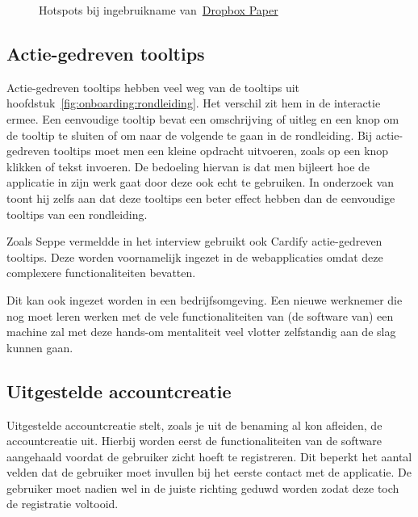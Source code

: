 \begin{figure}[h!]
    \centering
    \qquad
    \caption[Voorbeeld hotspots]{Hotspots bij ingebruikname van~\href{https://www.dropbox.com/paper}{Dropbox Paper}}
    \label{fig:onboarding:hotspots}
\end{figure}

\subsection{Actie-gedreven tooltips}
\label{sec:onboarding:actie-tooltips}

Actie-gedreven tooltips hebben veel weg van de tooltips uit hoofdstuk~\ref{fig:onboarding:rondleiding}. Het verschil zit hem in de interactie ermee. Een eenvoudige tooltip bevat een omschrijving of uitleg en een knop om de tooltip te sluiten of om naar de volgende te gaan in de rondleiding. Bij actie-gedreven tooltips moet men een kleine opdracht uitvoeren, zoals op een knop klikken of tekst invoeren. De bedoeling hiervan is dat men bijleert hoe de applicatie in zijn werk gaat door deze ook echt te gebruiken. In onderzoek van~\textcite{Oliveira2019} toont hij zelfs aan dat deze tooltips een beter effect hebben dan de eenvoudige tooltips van een rondleiding.

Zoals Seppe vermeldde in het interview gebruikt ook Cardify actie-gedreven tooltips. Deze worden voornamelijk ingezet in de webapplicaties omdat deze complexere functionaliteiten bevatten.

Dit kan ook ingezet worden in een bedrijfsomgeving. Een nieuwe werknemer die nog moet leren werken met de vele functionaliteiten van (de software van) een machine zal met deze hands-om mentaliteit veel vlotter zelfstandig aan de slag kunnen gaan.

\subsection{Uitgestelde accountcreatie}
\label{sec:onboarding:uitgestelde-accountcreatie}

Uitgestelde accountcreatie stelt, zoals je uit de benaming al kon afleiden, de accountcreatie uit. Hierbij worden eerst de functionaliteiten van de software aangehaald voordat de gebruiker zicht hoeft te registreren. Dit beperkt het aantal velden dat de gebruiker moet invullen bij het eerste contact met de applicatie. De gebruiker moet nadien wel in de juiste richting geduwd worden zodat deze toch de registratie voltooid.

